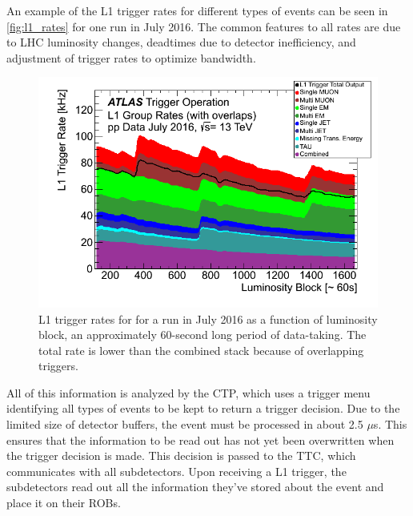 An example of the \ac{L1} trigger rates for different types of events can be seen in \autoref{fig:l1_rates} for one run in July 2016. The common features to all rates are due to \ac{LHC} luminosity changes, deadtimes due to detector inefficiency, and adjustment of trigger rates to optimize bandwidth.

\begin{centering}
\begin{figure}[!hbt]
\myfloatalign
\includegraphics[width=.90\linewidth]{figures/atlas/Time_L1GroupRate_Stack_2016_07.png}
\caption{\ac{L1} trigger rates for for a run in July 2016 as a function of luminosity block, an approximately 60-second long period of data-taking. The total rate is lower than the combined stack because of overlapping triggers.}
\label{fig:l1_rates}
\end{figure}
\end{centering}


All of this information is analyzed by the \ac{CTP}, which uses a trigger menu identifying all types of events to be kept to return a trigger decision. Due to the limited size of detector buffers, the event must be processed in about 2.5 $\mu$s. This ensures that the information to be read out has not yet been overwritten when the trigger decision is made. This decision is passed to the \ac{TTC}, which communicates with all subdetectors. Upon receiving a \ac{L1} trigger, the subdetectors read out all the information they've stored about the event and place it on their \acp{ROB}.

